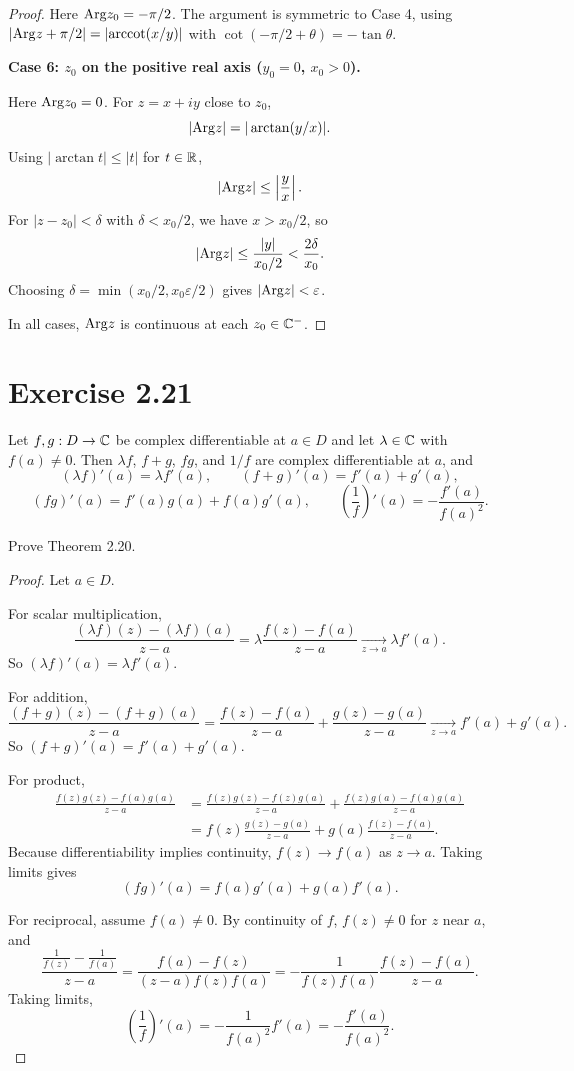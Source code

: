 \documentclass{article}
\begin{document}
\begin{proof}
  Here $\mathrm{Arg} z_0 = -\pi/2$. The argument is symmetric to Case 4, using
  $|\mathrm{Arg} z + \pi/2| = |\mathrm{arccot}(x/y)|$ with $\cot(-\pi/2 + \theta) =
  -\tan\theta$.

  \textbf{Case 6: $z_0$ on the positive real axis ($y_0 = 0$, $x_0 > 0$).}

  Here $\mathrm{Arg} z_0 = 0$. For $z = x + iy$ close to $z_0$,
  \[
    |\mathrm{Arg} z| = |\arctan(y/x)|.
  \]
  Using $|\arctan t| \le |t|$ for $t \in \mathbb{R}$,
  \[
    |\mathrm{Arg} z| \le \left|\frac{y}{x}\right|.
  \]
  For $|z - z_0| < \delta$ with $\delta < x_0/2$, we have $x > x_0/2$, so
  \[
    |\mathrm{Arg} z| \le \frac{|y|}{x_0/2} < \frac{2\delta}{x_0}.
  \]
  Choosing $\delta = \min(x_0/2, x_0\varepsilon/2)$ gives $|\mathrm{Arg} z| <
  \varepsilon$.

  In all cases, $\mathrm{Arg} z$ is continuous at each $z_0 \in \mathbb{C}^-$.
\end{proof}

\section{Exercise 2.21}

\begin{theorem}[Theorem 2.20]
  Let $f,g : D \to \mathbb{C}$ be complex differentiable at $a \in D$ and
  let $\lambda \in \mathbb{C}$ with $f(a) \ne 0$. Then
  $\lambda f$, $f+g$, $fg$, and $1/f$ are complex differentiable at $a$, and
  \[
    (\lambda f)'(a) = \lambda f'(a),
    \qquad
    (f+g)'(a) = f'(a) + g'(a),
  \]
  \[
    (fg)'(a) = f'(a)g(a) + f(a)g'(a),
    \qquad
    \left(\frac{1}{f}\right)'(a) = -\frac{f'(a)}{f(a)^2}.
  \]
\end{theorem}

Prove Theorem 2.20.

\begin{proof}
  Let $a\in D$.

  For scalar multiplication,
  \[
    \frac{(\lambda f)(z)-(\lambda f)(a)}{z-a}
    = \lambda\frac{f(z)-f(a)}{z-a}
    \xrightarrow[z\to a]{} \lambda f'(a).
  \]
  So $(\lambda f)'(a)=\lambda f'(a)$.

  For addition,
  \[
    \frac{(f+g)(z)-(f+g)(a)}{z-a}
    = \frac{f(z)-f(a)}{z-a} + \frac{g(z)-g(a)}{z-a}
    \xrightarrow[z\to a]{} f'(a)+g'(a).
  \]
  So $(f+g)'(a)=f'(a)+g'(a)$.

  For product,
  \[
    \begin{aligned}
      \frac{f(z)g(z)-f(a)g(a)}{z-a}
      &= \frac{f(z)g(z)-f(z)g(a)}{z-a}
      + \frac{f(z)g(a)-f(a)g(a)}{z-a} \\
      &= f(z)\frac{g(z)-g(a)}{z-a}
      + g(a)\frac{f(z)-f(a)}{z-a}.
    \end{aligned}
  \]
  Because differentiability implies continuity, $f(z)\to f(a)$ as
  $z\to a$. Taking limits gives
  \[
    (fg)'(a)=f(a)g'(a)+g(a)f'(a).
  \]

  For reciprocal, assume $f(a)\neq 0$. By continuity of $f$, $f(z)\neq 0$
  for $z$ near $a$, and
  \[
    \frac{\frac1{f(z)}-\frac1{f(a)}}{z-a}
    = \frac{f(a)-f(z)}{(z-a)f(z)f(a)}
    = -\frac{1}{f(z)f(a)}\frac{f(z)-f(a)}{z-a}.
  \]
  Taking limits,
  \[
    \left(\frac1f\right)'(a)
    = -\frac{1}{f(a)^2}f'(a)
    = -\frac{f'(a)}{f(a)^2}.
  \]
\end{proof}
\end{document}
